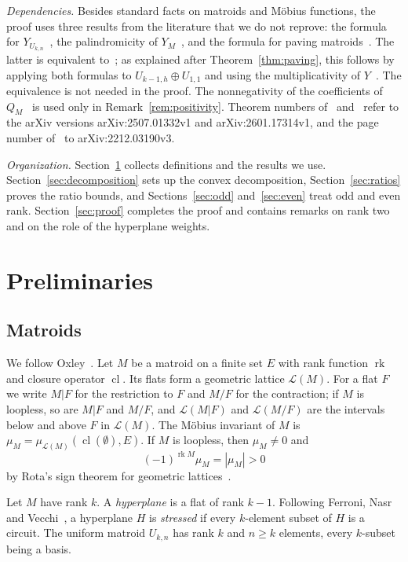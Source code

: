 \documentclass[11pt]{amsart}
\theoremstyle{definition}
\theoremstyle{remark}
\numberwithin{equation}{section}
\DeclareMathOperator{\rk}{rk}
\DeclareMathOperator{\cl}{cl}
\newcommand{\cL}{\mathcal{L}}
\begin{document}
\emph{Dependencies.} Besides standard facts on matroids and Möbius functions, the proof uses three results from the literature that we do not reprove: the formula for $Y_{U_{k,n}}$~\cite[Theorem~1.1]{GRX}, the palindromicity of $Y_M$~\cite[Lemma~2.2]{GRX}, and the formula for paving matroids~\cite[Theorem~1.7]{GLX}. The latter is equivalent to~\cite[Proposition~5.3]{GRX}; as explained after Theorem~\ref{thm:paving}, this follows by applying both formulas to $U_{k-1,h}\oplus U_{1,1}$ and using the multiplicativity of $Y$~\cite[Proposition~2.3]{GRX}. The equivalence is not needed in the proof. The nonnegativity of the coefficients of $Q_M$~\cite{BHMPW} is used only in Remark~\ref{rem:positivity}. Theorem numbers of~\cite{GRX} and~\cite{GLX} refer to the arXiv versions arXiv:2507.01332v1 and arXiv:2601.17314v1, and the page number of~\cite{FMSV} to arXiv:2212.03190v3.

\emph{Organization.} Section~\ref{sec:prelim} collects definitions and the results we use. Section~\ref{sec:decomposition} sets up the convex decomposition, Section~\ref{sec:ratios} proves the ratio bounds, and Sections~\ref{sec:odd} and~\ref{sec:even} treat odd and even rank. Section~\ref{sec:proof} completes the proof and contains remarks on rank two and on the role of the hyperplane weights.

\section{Preliminaries}\label{sec:prelim}

\subsection{Matroids}
We follow Oxley~\cite{Oxley}. Let $M$ be a matroid on a finite set $E$ with rank function $\rk$ and closure operator $\cl$. Its flats form a geometric lattice $\cL(M)$. For a flat $F$ we write $M|F$ for the restriction to $F$ and $M/F$ for the contraction; if $M$ is loopless, so are $M|F$ and $M/F$, and $\cL(M|F)$ and $\cL(M/F)$ are the intervals below and above $F$ in $\cL(M)$. The Möbius invariant of $M$ is $\mu_M=\mu_{\cL(M)}(\cl(\emptyset),E)$. If $M$ is loopless, then $\mu_M\ne0$ and
\begin{equation}\label{eq:rota}
(-1)^{\rk M}\mu_M=|\mu_M|>0
\end{equation}
by Rota's sign theorem for geometric lattices~\cite{Rota}.

Let $M$ have rank $k$. A \emph{hyperplane} is a flat of rank $k-1$. Following Ferroni, Nasr and Vecchi~\cite{FNV}, a hyperplane $H$ is \emph{stressed} if every $k$-element subset of $H$ is a circuit. The uniform matroid $U_{k,n}$ has rank $k$ and $n\ge k$ elements, every $k$-subset being a basis.
\end{document}
